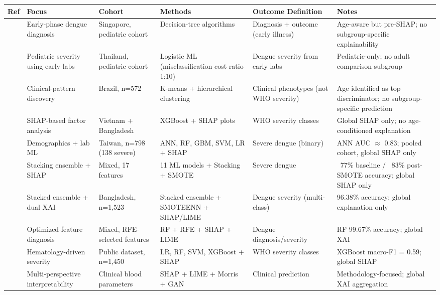 \documentclass[conference]{IEEEtran}
\begin{document}
\begin{table}[htbp]
\centering
\renewcommand{\arraystretch}{1.3}
\small
\caption{Summary of Existing Dengue Severity ML Studies}
\label{tab:lit_review}
\begin{xltabular}{\textwidth}{|X|X|X|X|X|X|}
\hline
\textbf{Ref} & \textbf{Focus} & \textbf{Cohort} & \textbf{Methods} & \textbf{Outcome Definition} & \textbf{Notes} \\
\hline
\cite{tanner2008} & Early-phase dengue diagnosis & Singapore, pediatric cohort & Decision-tree algorithms & Diagnosis + outcome (early illness) & Age-aware but pre-SHAP; no subgroup-specific explainability \\
\hline
\cite{potts2010} & Pediatric severity using early labs & Thailand, pediatric cohort & Logistic ML (misclassification cost ratio 1:10) & Dengue severity from early labs & Pediatric-only; no adult comparison subgroup \\
\hline
\cite{rajapakse2014} & Clinical-pattern discovery & Brazil, n=572 & K-means + hierarchical clustering & Clinical phenotypes (not WHO severity) & Age identified as top discriminator; no subgroup-specific prediction \\
\hline
\cite{chowdhury2022} & SHAP-based factor analysis & Vietnam + Bangladesh & XGBoost + SHAP plots & WHO severity classes & Global SHAP only; no age-conditioned explanation \\
\hline
\cite{huang2020} & Demographics + lab ML & Taiwan, n=798 (138 severe) & ANN, RF, GBM, SVM, LR + SHAP & Severe dengue (binary) & ANN AUC $\approx$ 0.83; pooled cohort, global SHAP only \\
\hline
\cite{masum2025} & Stacking ensemble + SHAP & Mixed, 17 features & 11 ML models + Stacking + SMOTE & Severe dengue & ~77\% baseline / ~83\% post-SMOTE accuracy; global SHAP only \\
\hline
\cite{tuhin2025} & Stacked ensemble + dual XAI & Bangladesh, n=1,523 & Stacked ensemble + SMOTEENN + SHAP/LIME & Dengue severity (multi-class) & 96.38\% accuracy; global explanation only \\
\hline
\cite{das2025} & Optimized-feature diagnosis & Mixed, RFE-selected features & RF + RFE + SHAP + LIME & Dengue diagnosis/severity & RF 99.67\% accuracy; global XAI \\
\hline
\cite{niazi2026} & Hematology-driven severity & Public dataset, n=1,450 & LR, RF, SVM, XGBoost + SHAP & WHO severity classes & XGBoost macro-F1 = 0.59; global SHAP \\
\hline
\cite{haque2025} & Multi-perspective interpretability & Clinical blood parameters & SHAP + LIME + Morris + GAN & Clinical prediction & Methodology-focused; global XAI aggregation \\

\end{xltabular}
\end{table}
\end{document}
